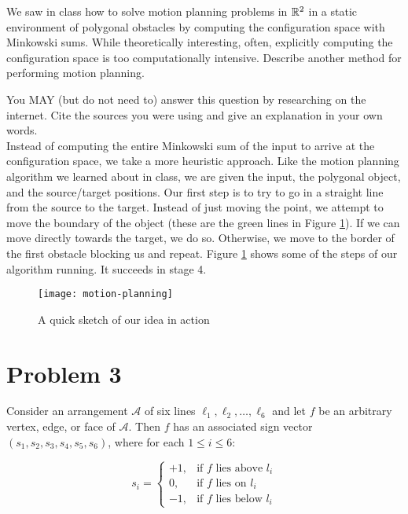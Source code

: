 \documentclass[11pt]{article}
\newcommand{\A}{{\mathcal{A}}}
\begin{document}
We saw in class how to solve motion planning problems in $\mathbb{R}^2$ in a static
environment of polygonal obstacles by computing the configuration space with
Minkowski sums.  While theoretically interesting, often, explicitly computing
the configuration space is too computationally intensive.  Describe another
method for performing motion planning.

You MAY (but do not need to) answer this question by researching on the
internet. Cite the sources you were using and give an explanation in your own
words. \\

\answer
Instead of computing the entire Minkowski sum of the input to arrive at the configuration space, we take a more heuristic approach.
Like the motion planning algorithm we learned about in class, we are given the input, the polygonal object, and the source/target positions.
Our first step is to try to go in a straight line from the source to the target.
Instead of just moving the point, we attempt to move the boundary of the object (these are the green lines in Figure \ref{fig:motion}).
If we can move directly towards the target, we do so.
Otherwise, we move to the border of the first obstacle blocking us and repeat.
Figure \ref{fig:motion} shows some of the steps of our algorithm running.
It succeeds in stage 4.

\begin{figure}[h]
	\centering
	\texttt{[image: motion-planning]}
	\caption{A quick sketch of our idea in action}
	\label{fig:motion}
\end{figure}

\newpage
\section*{Problem 3}

Consider an arrangement $\A$ of six lines $\ell_1, \ell_2, \ldots, \ell_6$ and
let $f$ be an arbitrary vertex, edge, or face of $\A$. Then $f$ has an
associated sign vector $(s_1, s_2, s_3, s_4, s_5, s_6)$, where for each $1 \le i
\le 6$:

$$
    s_i =
    \begin{cases}
        +1, & \text{if $f$ lies above $l_i$} \\
        0,  & \text{if $f$ lies on $l_i$} \\
        -1, & \text{if $f$ lies below $l_i$}
    \end{cases}
$$
\end{document}
